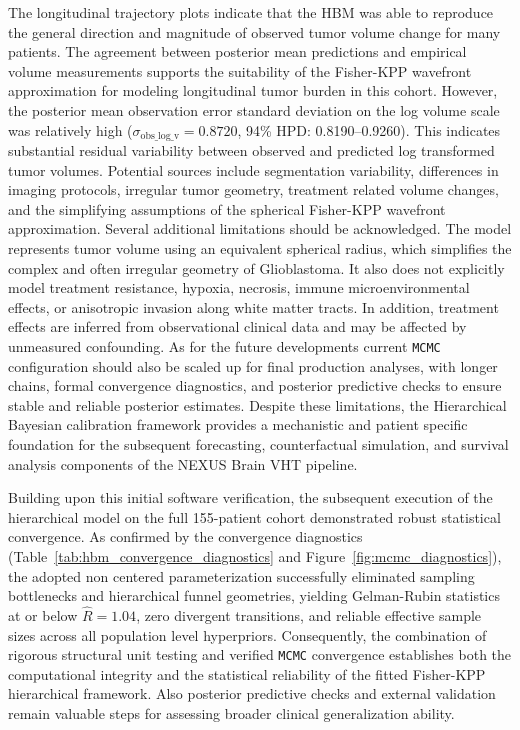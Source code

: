 The longitudinal trajectory plots indicate that the HBM was able to reproduce the general direction and magnitude of observed tumor volume change for many patients. The agreement between posterior mean predictions and empirical volume measurements supports the suitability of the Fisher-KPP wavefront approximation for modeling longitudinal tumor burden in this cohort. However, the posterior mean observation error standard deviation on the log volume scale was relatively high ($\sigma_{\mathrm{obs\_log\_v}} = 0.8720$, 94\% HPD: 0.8190--0.9260). This indicates substantial residual variability between observed and predicted log transformed tumor volumes. Potential sources include segmentation variability, differences in imaging protocols, irregular tumor geometry, treatment related volume changes, and the simplifying assumptions of the spherical Fisher-KPP wavefront approximation. Several additional limitations should be acknowledged. The model represents tumor volume using an equivalent spherical radius, which simplifies the complex and often irregular geometry of Glioblastoma. It also does not explicitly model treatment resistance, hypoxia, necrosis, immune microenvironmental effects, or anisotropic invasion along white matter tracts. In addition, treatment effects are inferred from observational clinical data and may be affected by unmeasured confounding. As for the future developments current \texttt{MCMC} configuration should also be scaled up for final production analyses, with longer chains, formal convergence diagnostics, and posterior predictive checks to ensure stable and reliable posterior estimates. Despite these limitations, the Hierarchical Bayesian calibration framework provides a mechanistic and patient specific foundation for the subsequent forecasting, counterfactual simulation, and survival analysis components of the NEXUS Brain VHT pipeline.

Building upon this initial software verification, the subsequent execution of the hierarchical model on the full 155-patient cohort demonstrated robust statistical convergence. As confirmed by the convergence diagnostics (Table~\ref{tab:hbm_convergence_diagnostics} and Figure~\ref{fig:mcmc_diagnostics}), the adopted non centered parameterization successfully eliminated sampling bottlenecks and hierarchical funnel geometries, yielding Gelman-Rubin statistics at or below $\widehat{R} = 1.04$, zero divergent transitions, and reliable effective sample sizes across all population level hyperpriors. Consequently, the combination of rigorous structural unit testing and verified \texttt{MCMC} convergence establishes both the computational integrity and the statistical reliability of the fitted Fisher-KPP hierarchical framework. Also posterior predictive checks and external validation remain valuable steps for assessing broader clinical generalization ability.

